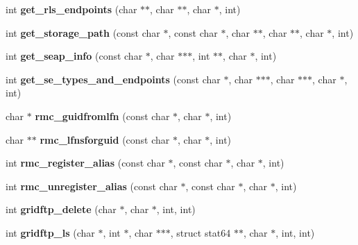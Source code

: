 \begin{DoxyCompactItemize}
\item 
int {\bfseries get\_\-rls\_\-endpoints} (char $\ast$$\ast$, char $\ast$$\ast$, char $\ast$, int)\label{group__internal__group_ga0075f0b544f623ee06e41c0876b3ee2b}

\item 
int {\bfseries get\_\-storage\_\-path} (const char $\ast$, const char $\ast$, char $\ast$$\ast$, char $\ast$$\ast$, char $\ast$, int)\label{group__internal__group_ga6dde6b142aabfc0576a9c4c588527e60}

\item 
int {\bfseries get\_\-seap\_\-info} (const char $\ast$, char $\ast$$\ast$$\ast$, int $\ast$$\ast$, char $\ast$, int)\label{group__internal__group_ga4ec9badcb1d58765ad4da5ea8f7d83e0}

\item 
int {\bfseries get\_\-se\_\-types\_\-and\_\-endpoints} (const char $\ast$, char $\ast$$\ast$$\ast$, char $\ast$$\ast$$\ast$, char $\ast$, int)\label{group__internal__group_gad174ff20ea7366c7283ccb58629ec9d0}

\item 
char $\ast$ {\bfseries rmc\_\-guidfromlfn} (const char $\ast$, char $\ast$, int)\label{group__internal__group_gae355985f3926d9925889bf830454ba2a}

\item 
char $\ast$$\ast$ {\bfseries rmc\_\-lfnsforguid} (const char $\ast$, char $\ast$, int)\label{group__internal__group_ga7a5e5c2d502ad1c4e166f95c5ffdff5e}

\item 
int {\bfseries rmc\_\-register\_\-alias} (const char $\ast$, const char $\ast$, char $\ast$, int)\label{group__internal__group_ga6729f246085b8087ebe9b9ac67aebc84}

\item 
int {\bfseries rmc\_\-unregister\_\-alias} (const char $\ast$, const char $\ast$, char $\ast$, int)\label{group__internal__group_gaf9bbb3b7c7c6b868359b8864164f9472}

\item 
int {\bfseries gridftp\_\-delete} (char $\ast$, char $\ast$, int, int)\label{group__internal__group_ga924efb69542e510a8f442041404f30fc}

\item 
int {\bfseries gridftp\_\-ls} (char $\ast$, int $\ast$, char $\ast$$\ast$$\ast$, struct stat64 $\ast$$\ast$, char $\ast$, int, int)\label{group__internal__group_ga834d66f2148a0cc95f52e8c224f017d4}

\end{DoxyCompactItemize}


